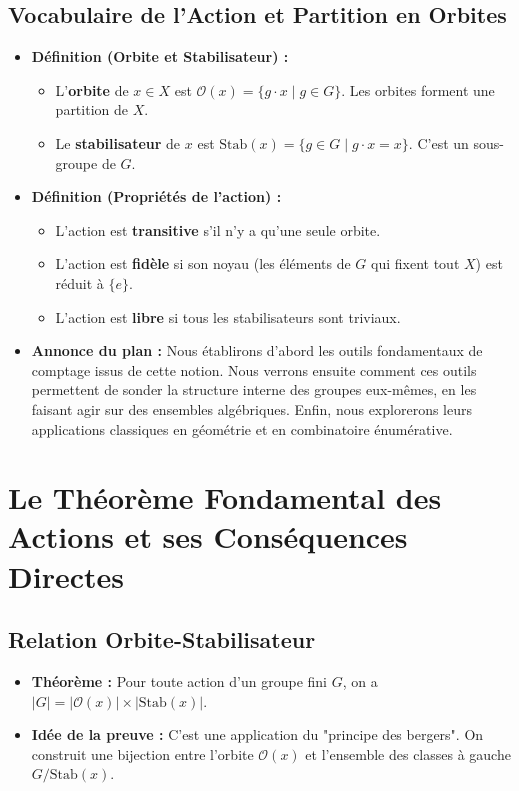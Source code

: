 \documentclass[12pt, a4paper, parskip=full]{report}
\theoremstyle{agregstyle}
\begin{document}
\subsection{Vocabulaire de l'Action et Partition en Orbites}
\begin{itemize}
    \item \textbf{Définition (Orbite et Stabilisateur) :}
        \begin{itemize}
            \item L'\textbf{orbite} de $x \in X$ est $\mathcal{O}(x) = \{g \cdot x \mid g \in G\}$. Les orbites forment une partition de $X$.
            \item Le \textbf{stabilisateur} de $x$ est $\mathrm{Stab}(x) = \{g \in G \mid g \cdot x = x\}$. C'est un sous-groupe de $G$.
        \end{itemize}
    \item \textbf{Définition (Propriétés de l'action) :}
        \begin{itemize}
            \item L'action est \textbf{transitive} s'il n'y a qu'une seule orbite.
            \item L'action est \textbf{fidèle} si son noyau (les éléments de $G$ qui fixent tout $X$) est réduit à $\{e\}$.
            \item L'action est \textbf{libre} si tous les stabilisateurs sont triviaux.
        \end{itemize}
    \item \textbf{Annonce du plan :} Nous établirons d'abord les outils fondamentaux de comptage issus de cette notion. Nous verrons ensuite comment ces outils permettent de sonder la structure interne des groupes eux-mêmes, en les faisant agir sur des ensembles algébriques. Enfin, nous explorerons leurs applications classiques en géométrie et en combinatoire énumérative.
\end{itemize}

\section{Le Théorème Fondamental des Actions et ses Conséquences Directes}
\subsection{Relation Orbite-Stabilisateur}
\begin{itemize}
    \item \textbf{Théorème :} Pour toute action d'un groupe fini $G$, on a $|G| = |\mathcal{O}(x)| \times |\mathrm{Stab}(x)|$.
    \item \textbf{Idée de la preuve :} C'est une application du "principe des bergers". On construit une bijection entre l'orbite $\mathcal{O}(x)$ et l'ensemble des classes à gauche $G/\mathrm{Stab}(x)$.
\end{itemize}
\end{document}
